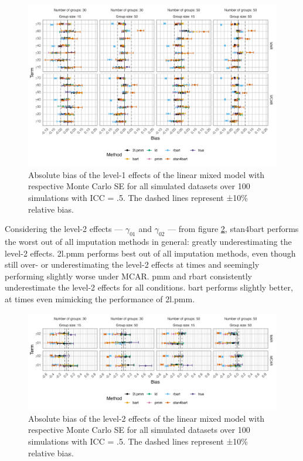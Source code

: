 \documentclass[10pt, a4paper, titlepage]{article}
\begin{document}
\begin{figure}[H]
    \centering 
    \includegraphics[width=1\textwidth]{biaslevel1.png}
    \caption{Absolute bias of the level-1 effects of the linear mixed model with respective Monte Carlo SE for all simulated datasets over 100 simulations with ICC = .5. The dashed lines represent ±10\% relative bias.}
    \label{fig:biaslevel1}
\end{figure}

Considering the level-2 effects --- $\gamma_{01}$ and $\gamma_{02}$ --- from figure \ref{fig:biaslevel2}, stan4bart performs the worst out of all imputation methods in general: greatly underestimating the level-2 effects. 2l.pmm performs best out of all imputation methods, even though still over- or underestimating the level-2 effects at times and seemingly performing slightly worse under MCAR. pmm and rbart consistently underestimate the level-2 effects for all conditions. bart performs slightly better, at times even mimicking the performance of 2l.pmm. 

\begin{figure}[H]
    \centering
    \includegraphics[width=1\textwidth]{biaslevel2.png}
    \caption{Absolute bias of the level-2 effects of the linear mixed model with respective Monte Carlo SE for all simulated datasets over 100 simulations with ICC = .5. The dashed lines represent ±10\% relative bias.}
    \label{fig:biaslevel2}
\end{figure}
\end{document}
